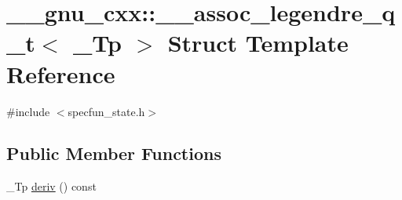 \hypertarget{struct____gnu__cxx_1_1____assoc__legendre__q__t}{}\section{\+\_\+\+\_\+gnu\+\_\+cxx\+:\+:\+\_\+\+\_\+assoc\+\_\+legendre\+\_\+q\+\_\+t$<$ \+\_\+\+Tp $>$ Struct Template Reference}
\label{struct____gnu__cxx_1_1____assoc__legendre__q__t}


{\ttfamily \#include $<$specfun\+\_\+state.\+h$>$}

\subsection*{Public Member Functions}
\begin{DoxyCompactItemize}
\item 
\+\_\+\+Tp \hyperlink{struct____gnu__cxx_1_1____assoc__legendre__q__t_a4c888580c659eaafe8dfc4eda957a516}{deriv} () const
\end{DoxyCompactItemize}
